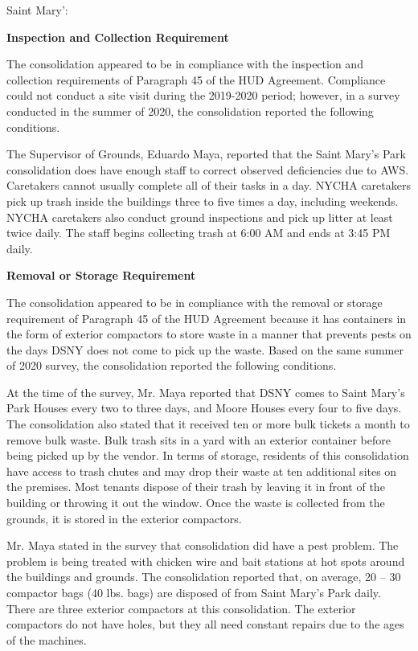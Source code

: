 Saint Mary': 

\textbf{Inspection and Collection Requirement} 

 

The consolidation appeared to be in compliance with the inspection and collection requirements of Paragraph 45 of the HUD Agreement. Compliance could not conduct a site visit during the 2019-2020 period; however, in a survey conducted in the summer of 2020, the consolidation reported the following conditions.

The Supervisor of Grounds, Eduardo Maya, reported that the Saint Mary's Park consolidation does have enough staff to correct observed deficiencies due to AWS. Caretakers cannot usually complete all of their tasks in a day. NYCHA caretakers pick up trash inside the buildings three to five times a day, including weekends. NYCHA caretakers also conduct ground inspections and pick up litter at least twice daily. The staff begins collecting trash at 6:00 AM and ends at 3:45 PM daily.

\textbf{Removal or Storage Requirement} 

The consolidation appeared to be in compliance with the removal or storage requirement of Paragraph  45 of the HUD Agreement because it has containers in the form of exterior compactors to store waste in a manner that prevents pests on the days DSNY does not come to pick up the waste. Based on the same summer of  2020  survey, the consolidation reported the following conditions.

 

At the time of the survey, Mr. Maya reported that DSNY comes to Saint Mary's Park Houses every two to three days, and Moore Houses every four to five days. The consolidation also stated that it received ten or more bulk tickets a month to remove bulk waste. Bulk trash sits in a yard with an exterior container before being picked up by the vendor. In terms of storage, residents of this consolidation have access to trash chutes and may drop their waste at ten additional sites on the premises. Most tenants dispose of their trash by leaving it in front of the building or throwing it out the window. Once the waste is collected from the grounds, it is stored in the exterior compactors.  

 

Mr. Maya stated in the survey that consolidation did have a pest problem. The problem is being treated with chicken wire and bait stations at hot spots around the buildings and grounds. The consolidation reported that, on average, 20 -- 30 compactor bags (40 lbs. bags)  are disposed of from Saint Mary's Park daily. There are three exterior compactors at this consolidation. The exterior compactors do not have holes, but they all need constant repairs due to the ages of the machines. 

